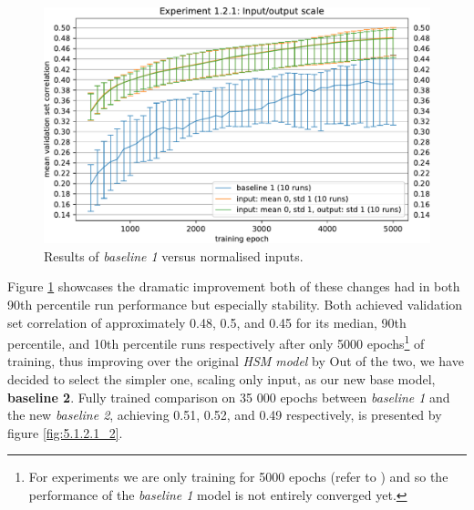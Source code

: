 \begin{figure}[H]
    \centering
    \includegraphics[width=1\textwidth]{../figures/05_1_2_1}
    \caption[Experiment 1.2.1]{Results of \textit{baseline 1} versus normalised inputs\protect\footnotemark.}
    \label{fig:5.1.2.1}
\end{figure}

Figure \ref{fig:5.1.2.1} showcases the dramatic improvement both of these changes had in both 90th percentile run performance but especially stability. Both achieved validation set correlation of approximately 0.48, 0.5, and 0.45 for its median, 90th percentile, and 10th percentile runs respectively after only 5000 epochs\footnote{For experiments we are only training for 5000 epochs (refer to  ) and so the performance of the \emph{baseline 1} model is not entirely converged yet.} of training, thus improving over the original \textit{HSM model} by \citeauthor{antolik} Out of the two, we have decided to select the simpler one, scaling only input, as our new base model, \textbf{baseline 2}. Fully trained comparison on 35 000 epochs between \emph{baseline 1} and the new \emph{baseline 2}, achieving 0.51, 0.52, and 0.49 respectively, is presented by figure \ref{fig:5.1.2.1_2}.

